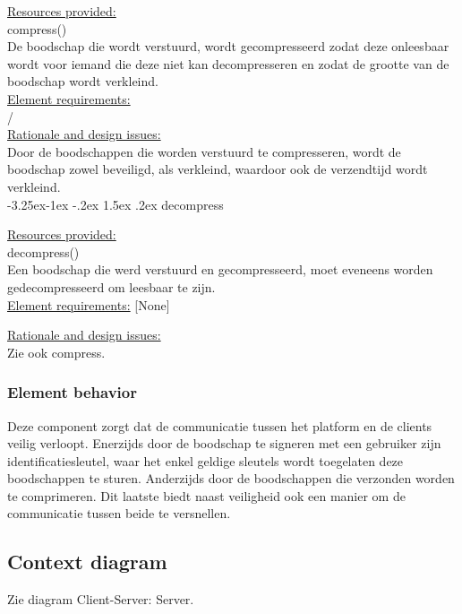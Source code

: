 \documentclass[a4paper,10pt]{book}
\makeatletter
\renewcommand\paragraph{\@startsection{paragraph}{4}{\z@}%
  {-3.25ex\@plus -1ex \@minus -.2ex}%
  {1.5ex \@plus .2ex}%
  {\normalfont\normalsize\bfseries}}
\makeatother
\begin{document}
\underline{Resources provided:}\\
compress()\\
De boodschap die wordt verstuurd, wordt gecompresseerd zodat deze onleesbaar wordt voor iemand die deze niet kan decompresseren en zodat de grootte van de boodschap wordt verkleind.\\

\underline{Element requirements:}\\
/\\

\underline{Rationale and design issues:}\\
Door de boodschappen die worden verstuurd te compresseren, wordt de boodschap zowel beveiligd, als verkleind, waardoor ook de verzendtijd wordt verkleind.\\

\paragraph{decompress}

\underline{Resources provided:}\\
decompress()\\
Een boodschap die werd verstuurd en gecompresseerd, moet eveneens worden gedecompresseerd om leesbaar te zijn.\\

\underline{Element requirements:}
[None]

\underline{Rationale and design issues:}\\
Zie ook compress.\\

\subsubsection{Element behavior}
Deze component zorgt dat de communicatie tussen het platform en de clients veilig verloopt. Enerzijds door de boodschap te signeren met een gebruiker zijn identificatiesleutel, waar het enkel geldige sleutels wordt toegelaten deze boodschappen te sturen. Anderzijds door de boodschappen die verzonden worden te comprimeren. Dit laatste biedt naast veiligheid ook een manier om de communicatie tussen beide te versnellen.\\

\subsection{Context diagram}
Zie diagram Client-Server: Server. \\
\end{document}
